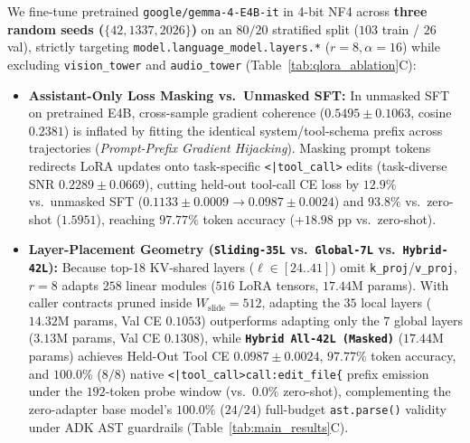 \documentclass[10pt,twocolumn,letterpaper]{article}
\begin{document}
We fine-tune pretrained \texttt{google/gemma-4-E4B-it} in 4-bit NF4 across \textbf{three random seeds ($\{42,1337,2026\}$)} on an $80/20$ stratified split ($103$ train / $26$ val), strictly targeting \texttt{model.language\_model.layers.*} ($r{=}8, \alpha{=}16$) while excluding \texttt{vision\_tower} and \texttt{audio\_tower} (Table~\ref{tab:qlora_ablation}C):
\begin{itemize}
    \item \textbf{Assistant-Only Loss Masking vs.\ Unmasked SFT:} In unmasked SFT on pretrained E4B, cross-sample gradient coherence ($0.5495\pm0.1063$, cosine $0.2381$) is inflated by fitting the identical system/tool-schema prefix across trajectories (\emph{Prompt-Prefix Gradient Hijacking}). Masking prompt tokens redirects LoRA updates onto task-specific \texttt{<|tool\_call>} edits (task-diverse SNR $0.2289\pm0.0669$), cutting held-out tool-call CE loss by \textbf{$12.9\%$} vs.\ unmasked SFT ($0.1133\pm0.0009 \to 0.0987\pm0.0024$) and \textbf{$93.8\%$} vs.\ zero-shot ($1.5951$), reaching \textbf{$97.77\%$} token accuracy ($+18.98\text{ pp}$ vs.\ zero-shot).
    \item \textbf{Layer-Placement Geometry (\texttt{Sliding-35L} vs.\ \texttt{Global-7L} vs.\ \texttt{Hybrid-42L}):} Because top-18 KV-shared layers ($\ell \in [24..41]$) omit \texttt{k\_proj}/\texttt{v\_proj}, $r{=}8$ adapts $258$ linear modules ($516$ LoRA tensors, $17.44\text{M}$ params). With caller contracts pruned inside $W_{\text{slide}}{=}512$, adapting the $35$ local layers ($14.32\text{M}$ params, Val CE $0.1053$) outperforms adapting only the $7$ global layers ($3.13\text{M}$ params, Val CE $0.1308$), while \textbf{\texttt{Hybrid All-42L (Masked)}} ($17.44\text{M}$ params) achieves Held-Out Tool CE \textbf{$0.0987\pm0.0024$}, $97.77\%$ token accuracy, and $100.0\%$ ($8/8$) native \texttt{<|tool\_call>call:edit\_file\{} prefix emission under the $192$-token probe window (vs.\ $0.0\%$ zero-shot), complementing the zero-adapter base model's $100.0\%$ ($24/24$) full-budget \texttt{ast.parse()} validity under ADK AST guardrails (Table~\ref{tab:main_results}C).
\end{itemize}
\end{document}

